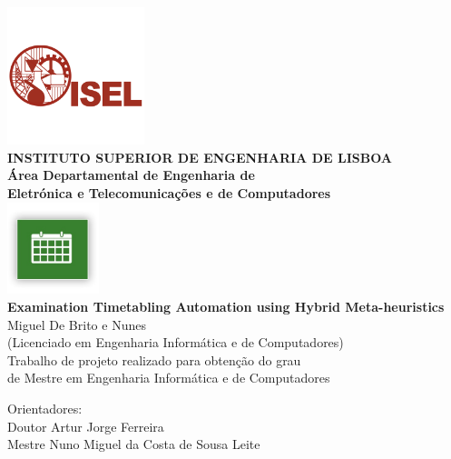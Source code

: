 \begin{titlepage}
	\thispagestyle{empty}
	\begin{center}
		\includegraphics[width=0.3\textwidth,natwidth=720,natheight=434]{./images/isellogo.png} \\[0.5cm]
		{\Large \textbf{INSTITUTO SUPERIOR DE ENGENHARIA DE LISBOA}} \\[0.5cm]
		{\Large \textbf{Área Departamental de Engenharia de \\Eletrónica e Telecomunica\c cões e de Computadores}} \\[0.8cm]		
		\includegraphics[width=0.2\textwidth,natwidth=300,natheight=300]{./images/timetable.jpg} \\[0.8cm]
		\fontsize{18pt}{10pt}\selectfont
		{\textbf{Examination Timetabling Automation using Hybrid Meta-heuristics}} \\[0.8cm]
		\fontsize{16pt}{10pt}\selectfont
		Miguel De Brito e Nunes\\[0.2cm]
		\fontsize{14pt}{10pt}\selectfont
		(Licenciado em Engenharia Informática e de Computadores)\\[0.8cm]
		\fontsize{12pt}{10pt}\selectfont
		{Trabalho de projeto realizado para obten\c cão do grau\\de Mestre em Engenharia Informática e de Computadores} \\[0.8cm]
		\fontsize{16pt}{10pt}\selectfont
		\vfill
		\begin{tabbing}
		   \fontsize{12pt}{10pt}\selectfont
		   Orientadores: \\
		   \fontsize{11pt}{10pt}\selectfont
		   \hspace{1.1cm}Doutor Artur Jorge Ferreira \\
		   \fontsize{11pt}{10pt}\selectfont
		   \hspace{1.1cm}Mestre Nuno Miguel da Costa de Sousa Leite \\

\end{tabbing}
\end{center}
\end{titlepage}
